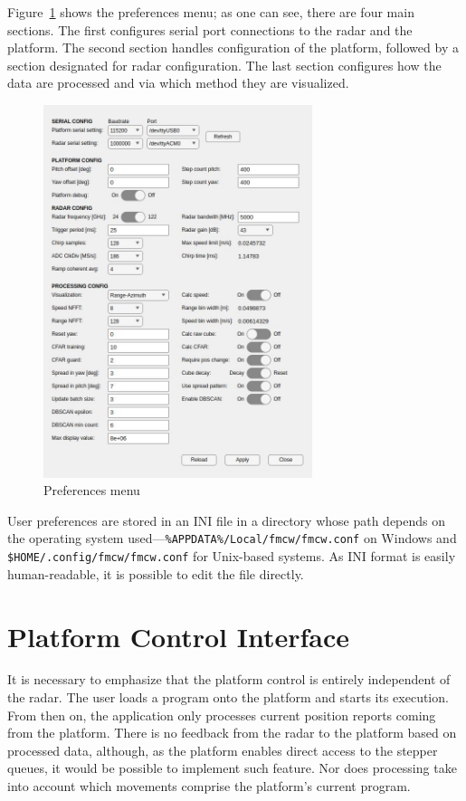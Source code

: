 Figure~\ref{fig:preferences} shows the preferences menu; as one can see, there are four main sections.
The first configures serial port connections to the radar and the platform.
The second section handles configuration of the platform, followed by a section designated for radar configuration.
The last section configures how the data are processed and via which method they are visualized.

\begin{figure}[h!]
  \centering
  \includegraphics[width=0.7\textwidth]{../img/preferences.jpg}
  \caption[Preferences menu]{Preferences menu}
  \label{fig:preferences}
\end{figure}

User preferences are stored in an INI file in a directory whose path depends on the operating system used—\texttt{\%APPDATA\%/Local/fmcw/fmcw.conf} on Windows and \texttt{\$HOME/.config/fmcw/fmcw.conf} for Unix-based systems.
As INI format is easily human-readable, it is possible to edit the file directly.


\section{Platform Control Interface}

It is necessary to emphasize that the platform control is entirely independent of the radar.
The user loads a program onto the platform and starts its execution.
From then on, the application only processes current position reports coming from the platform.
There is no feedback from the radar to the platform based on processed data, although, as the platform enables direct access to the stepper queues, it would be possible to implement such feature.
Nor does processing take into account which movements comprise the platform's current program.

